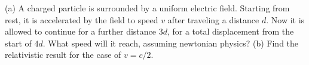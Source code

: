 (a) A charged particle is surrounded by a uniform electric field.
Starting from rest, it is accelerated by the field to speed $v$ after
traveling a distance $d$. Now it is allowed to continue for a further
distance $3d$, for a total displacement from the start of $4d$.
What speed will it reach,
assuming newtonian physics?\hwendpart
(b) Find the relativistic result for the case of $v=c/2$.
